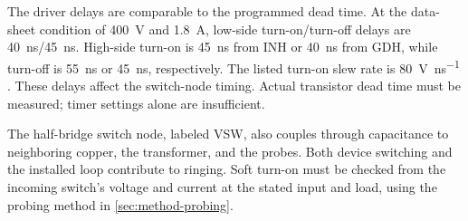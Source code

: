 The driver delays are comparable to the programmed dead time. At the data-sheet condition of \SI{400}{\volt} and \SI{1.8}{\ampere}, low-side turn-on/turn-off delays are \SI{40}{\nano\second}/\SI{45}{\nano\second}. High-side turn-on is \SI{45}{\nano\second} from INH or \SI{40}{\nano\second} from GDH, while turn-off is \SI{55}{\nano\second} or \SI{45}{\nano\second}, respectively. The listed turn-on slew rate is \SI{80}{\volt\per\nano\second} \cite{tiLMG2652}. These delays affect the switch-node timing. Actual transistor dead time must be measured; timer settings alone are insufficient.

The half-bridge switch node, labeled VSW, also couples through capacitance to neighboring copper, the transformer, and the probes. Both device switching and the installed loop contribute to ringing. Soft turn-on must be checked from the incoming switch's voltage and current at the stated input and load, using the probing method in \cref{sec:method-probing}.
